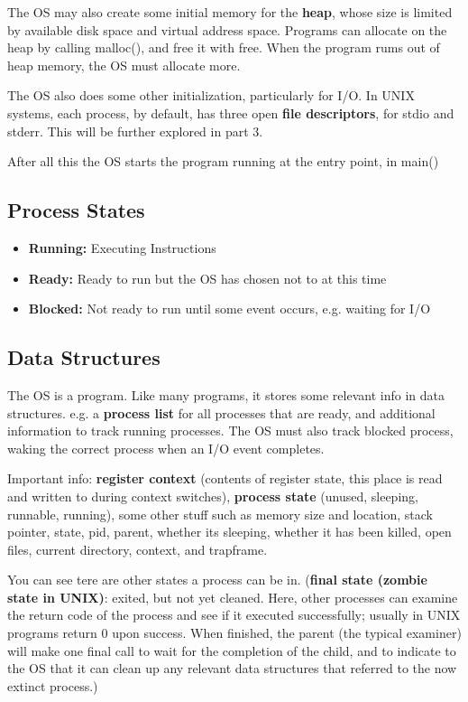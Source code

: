 \documentclass{article}
\begin{document}
The OS may also create some initial memory for the \textbf{heap}, whose size is limited by available disk space and virtual address space.
Programs can allocate on the heap by calling \textsf{malloc()}, and free it with \textsf{free}.
When the program rums out of heap memory, the OS must allocate more.

The OS also does some other initialization, particularly for I/O.
In UNIX systems, each process, by default, has three open \textbf{file descriptors}, for stdio and stderr.
This will be further explored in part 3.

After all this the OS starts the program running at the entry point, in \textsf{main()}

\subsection{Process States}

\begin{itemize}
    \item \textbf{Running:} Executing Instructions
    \item \textbf{Ready:} Ready to run but the OS has chosen not to at this time
    \item \textbf{Blocked:} Not ready to run until some event occurs, e.g. waiting for I/O
\end{itemize}

\subsection{Data Structures}

The OS is a program.
Like many programs, it stores some relevant info in data structures.
e.g. a \textbf{process list} for all processes that are ready, and additional information to track running processes.
The OS must also track blocked process, waking the correct process when an I/O event completes.

Important info: \textbf{register context} (contents of register state, this place is read and written to during context switches), \textbf{process state} (unused, sleeping, runnable, running), some other stuff such as memory size and location, stack pointer, state, pid, parent, whether its sleeping, whether it has been killed, open files, current directory, context, and trapframe.

You can see tere are other states a process can be in.
(\textbf{final state (zombie state in UNIX)}: exited, but not yet cleaned.
Here, other processes can examine the return code of the process and see if it executed successfully; usually in UNIX programs return 0 upon success.
When finished, the parent (the typical examiner) will make one final call to wait for the completion of the child, and to indicate to the OS that it can clean up any relevant data structures that referred to the now extinct process.)
\end{document}
